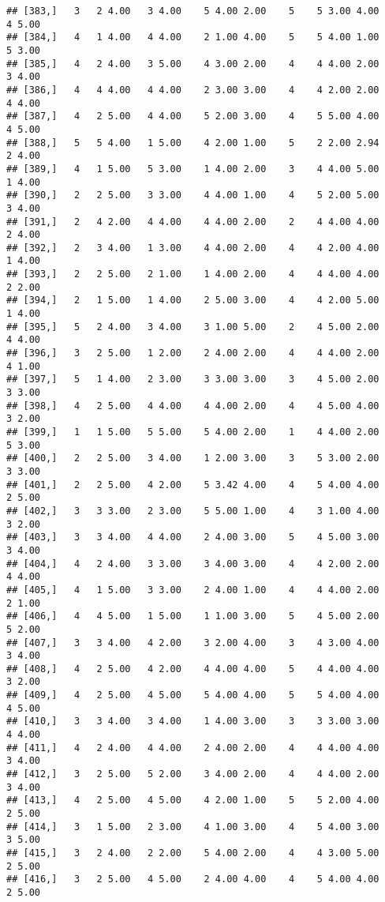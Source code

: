 \documentclass[]{article}
\begin{document}
\begin{verbatim}
## [383,]   3   2 4.00   3 4.00    5 4.00 2.00    5    5 3.00 4.00    4 5.00
## [384,]   4   1 4.00   4 4.00    2 1.00 4.00    5    5 4.00 1.00    5 3.00
## [385,]   4   2 4.00   3 5.00    4 3.00 2.00    4    4 4.00 2.00    3 4.00
## [386,]   4   4 4.00   4 4.00    2 3.00 3.00    4    4 2.00 2.00    4 4.00
## [387,]   4   2 5.00   4 4.00    5 2.00 3.00    4    5 5.00 4.00    4 5.00
## [388,]   5   5 4.00   1 5.00    4 2.00 1.00    5    2 2.00 2.94    2 4.00
## [389,]   4   1 5.00   5 3.00    1 4.00 2.00    3    4 4.00 5.00    1 4.00
## [390,]   2   2 5.00   3 3.00    4 4.00 1.00    4    5 2.00 5.00    3 4.00
## [391,]   2   4 2.00   4 4.00    4 4.00 2.00    2    4 4.00 4.00    2 4.00
## [392,]   2   3 4.00   1 3.00    4 4.00 2.00    4    4 2.00 4.00    1 4.00
## [393,]   2   2 5.00   2 1.00    1 4.00 2.00    4    4 4.00 4.00    2 2.00
## [394,]   2   1 5.00   1 4.00    2 5.00 3.00    4    4 2.00 5.00    1 4.00
## [395,]   5   2 4.00   3 4.00    3 1.00 5.00    2    4 5.00 2.00    4 4.00
## [396,]   3   2 5.00   1 2.00    2 4.00 2.00    4    4 4.00 2.00    4 1.00
## [397,]   5   1 4.00   2 3.00    3 3.00 3.00    3    4 5.00 2.00    3 3.00
## [398,]   4   2 5.00   4 4.00    4 4.00 2.00    4    4 5.00 4.00    3 2.00
## [399,]   1   1 5.00   5 5.00    5 4.00 2.00    1    4 4.00 2.00    5 3.00
## [400,]   2   2 5.00   3 4.00    1 2.00 3.00    3    5 3.00 2.00    3 3.00
## [401,]   2   2 5.00   4 2.00    5 3.42 4.00    4    5 4.00 4.00    2 5.00
## [402,]   3   3 3.00   2 3.00    5 5.00 1.00    4    3 1.00 4.00    3 2.00
## [403,]   3   3 4.00   4 4.00    2 4.00 3.00    5    4 5.00 3.00    3 4.00
## [404,]   4   2 4.00   3 3.00    3 4.00 3.00    4    4 2.00 2.00    4 4.00
## [405,]   4   1 5.00   3 3.00    2 4.00 1.00    4    4 4.00 2.00    2 1.00
## [406,]   4   4 5.00   1 5.00    1 1.00 3.00    5    4 5.00 2.00    5 2.00
## [407,]   3   3 4.00   4 2.00    3 2.00 4.00    3    4 3.00 4.00    3 4.00
## [408,]   4   2 5.00   4 2.00    4 4.00 4.00    5    4 4.00 4.00    3 2.00
## [409,]   4   2 5.00   4 5.00    5 4.00 4.00    5    5 4.00 4.00    4 5.00
## [410,]   3   3 4.00   3 4.00    1 4.00 3.00    3    3 3.00 3.00    4 4.00
## [411,]   4   2 4.00   4 4.00    2 4.00 2.00    4    4 4.00 4.00    3 4.00
## [412,]   3   2 5.00   5 2.00    3 4.00 2.00    4    4 4.00 2.00    3 4.00
## [413,]   4   2 5.00   4 5.00    4 2.00 1.00    5    5 2.00 4.00    2 5.00
## [414,]   3   1 5.00   2 3.00    4 1.00 3.00    4    5 4.00 3.00    3 5.00
## [415,]   3   2 4.00   2 2.00    5 4.00 2.00    4    4 3.00 5.00    2 5.00
## [416,]   3   2 5.00   4 5.00    2 4.00 4.00    4    5 4.00 4.00    2 5.00

\end{verbatim}
\end{document}
